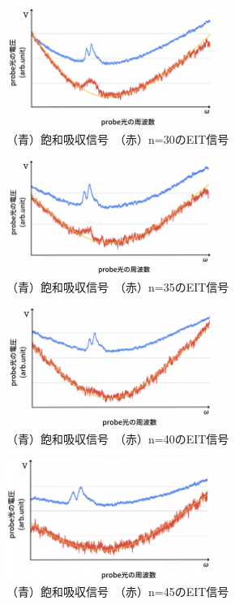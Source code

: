 \documentclass[dvipdfmx]{jsreport}
\begin{document}
\begin{figure}[hbtp]
\centering
\includegraphics[width=0.6\textwidth]{images/eit30.png}
\caption{\label{fig:eit30}（青）飽和吸収信号　（赤）n=30のEIT信号}
\end{figure}
\begin{figure}[hbtp]
\centering
\includegraphics[width=0.6\textwidth]{images/eit35.png}
\caption{\label{fig:eit35}（青）飽和吸収信号　（赤）n=35のEIT信号}
\end{figure}
\begin{figure}[hbtp]
\centering
\includegraphics[width=0.6\textwidth]{images/eit40.png}
\caption{\label{fig:eit40}（青）飽和吸収信号　（赤）n=40のEIT信号}
\end{figure}
\begin{figure}[hbtp]
\centering
\includegraphics[width=0.6\textwidth]{images/eit45.png}
\caption{\label{fig:eit45}（青）飽和吸収信号　（赤）n=45のEIT信号}
\end{figure}
\end{document}
